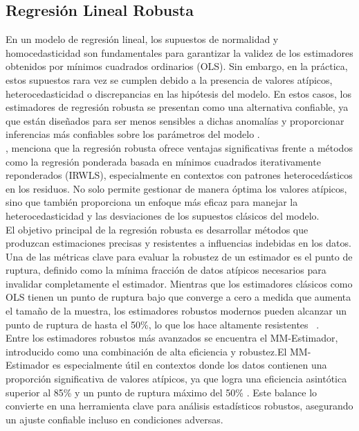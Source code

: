 \subsection{Regresión Lineal Robusta}
En un modelo de regresión lineal, los supuestos de normalidad y homocedasticidad son fundamentales para garantizar la validez de los estimadores obtenidos por mínimos cuadrados ordinarios (OLS). Sin embargo, en la práctica, estos supuestos rara vez se cumplen debido a la presencia de valores atípicos, heterocedasticidad o discrepancias en las hipótesis del modelo. En estos casos, los estimadores de regresión robusta se presentan como una alternativa confiable, ya que están diseñados para ser menos sensibles a dichas anomalías y proporcionar inferencias más confiables sobre los parámetros del modelo \parencite{zacarias-2023}.\\

\textcite{annalisa-2024}, menciona que la regresión robusta ofrece ventajas significativas frente a métodos como la regresión ponderada basada en mínimos cuadrados iterativamente reponderados (IRWLS), especialmente en contextos con patrones heterocedásticos en los residuos. No solo permite gestionar de manera óptima los valores atípicos, sino que también proporciona un enfoque más eficaz para manejar la heterocedasticidad y las desviaciones de los supuestos clásicos del modelo.\\


El objetivo principal de la regresión robusta es desarrollar métodos que produzcan estimaciones precisas y resistentes a influencias indebidas en los datos. Una de las métricas clave para evaluar la robustez de un estimador es el punto de ruptura, definido como la mínima fracción de datos atípicos necesarios para invalidar completamente el estimador. Mientras que los estimadores clásicos como OLS tienen un punto de ruptura bajo que converge a cero a medida que aumenta el tamaño de la muestra, los estimadores robustos modernos pueden alcanzar un punto de ruptura de hasta el 50\%, lo que los hace altamente resistentes ~\parencites{siegel-1982,rousseeuw-1984}. \\

Entre los estimadores robustos más avanzados se encuentra el MM-Estimador, introducido como una combinación de alta eficiencia y robustez.El MM-Estimador es especialmente útil en contextos donde los datos contienen una proporción significativa de valores atípicos, ya que logra una eficiencia asintótica superior al 85\% y un punto de ruptura máximo del 50\% \parencite{rousseeuw-yohai-1984}. Este balance lo convierte en una herramienta clave para análisis estadísticos robustos, asegurando un ajuste confiable incluso en condiciones adversas.\\



